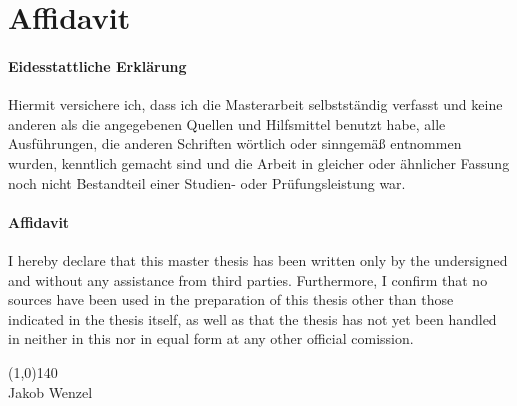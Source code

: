 \chapter*{Affidavit}
\subsubsection{Eidesstattliche Erklärung}

Hiermit versichere ich, dass ich die Masterarbeit selbstständig verfasst
und keine anderen als die angegebenen Quellen und Hilfsmittel benutzt habe,
alle Ausführungen, die anderen Schriften wörtlich oder sinngemäß entnommen
wurden, kenntlich gemacht sind und die Arbeit in gleicher oder ähnlicher
Fassung noch nicht Bestandteil einer Studien- oder Prüfungsleistung war.

\subsubsection{Affidavit}
I hereby declare that this master thesis has been written only by the undersigned and without any assistance from third parties.
Furthermore, I confirm that no sources have been used in the preparation of this thesis other than those indicated in the thesis itself, as well
as that the thesis has not yet been handled in neither in this nor in equal form  at any other official comission.

\vspace{1.5cm}
\line(1,0){140}\\
Jakob Wenzel
